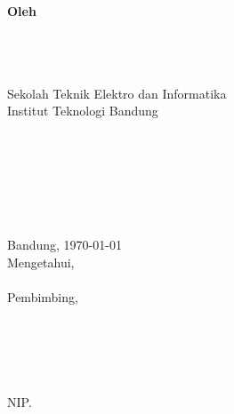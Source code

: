 \documentclass[../main/main.tex]{subfiles}
\begin{document}
\begin{titlepage}
\makeatletter
\begin{center}
\begin{spacing}{\double}
\judul{\@title}\\
\end{spacing}
~\\
~\\
~\\
\\
~\\
~\\
\textbf{Oleh}\\
\begin{spacing}{\semidouble}
\judul{\@author}\\
\\
\\
Sekolah Teknik Elektro dan Informatika\\
Institut Teknologi Bandung\\
\end{spacing}
~\\
~\\
~\\
~\\
~\\
~\\
Bandung, \today\\
Mengetahui,\\
~\\
Pembimbing,
~\\
~\\
~\\
~\\
~\\
\underline{\@pembimbingI}\\
NIP. \@nipI
\end{center}
\makeatother
\end{titlepage}
\end{document}
